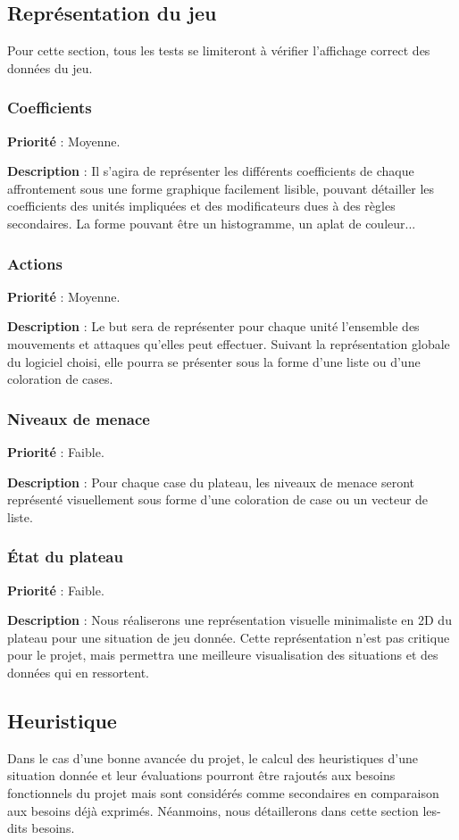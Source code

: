 		\subsection{Représentation du jeu}
			Pour cette section, tous les tests se limiteront à vérifier l'affichage correct des données du jeu.
			
			\subsubsection{Coefficients}
			\textbf{Priorité} : Moyenne.
			
			\textbf{Description} : Il s'agira de représenter les différents coefficients de chaque affrontement sous une forme graphique facilement lisible, pouvant détailler les coefficients des unités impliquées et des modificateurs dues à des règles secondaires. La forme pouvant être un histogramme, un aplat de couleur...
			\subsubsection{Actions}
			\textbf{Priorité} : Moyenne.
			
			\textbf{Description} : Le but sera de représenter pour chaque unité l'ensemble des mouvements et attaques qu'elles peut effectuer. Suivant la représentation globale du logiciel choisi, elle pourra se présenter sous la forme d'une liste ou d'une coloration de cases.
			
			\subsubsection{Niveaux de menace}
			\textbf{Priorité} : Faible.
			
			\textbf{Description} : Pour chaque case du plateau, les niveaux de menace seront représenté visuellement sous forme d'une coloration de case ou un vecteur de liste.
			
			\subsubsection{État du plateau}
			\textbf{Priorité} : Faible.
			
			\textbf{Description} : Nous réaliserons une représentation visuelle minimaliste en 2D du plateau pour une situation de jeu donnée. Cette représentation n'est pas critique pour le projet, mais permettra une meilleure visualisation des situations et des données qui en ressortent.	
			
	\subsection{Heuristique}
		Dans le cas d'une bonne avancée du projet, le calcul des heuristiques d'une situation donnée et leur évaluations pourront être rajoutés aux besoins fonctionnels du projet mais sont considérés comme secondaires en comparaison aux besoins déjà exprimés. Néanmoins, nous détaillerons dans cette section les-dits besoins.
		

